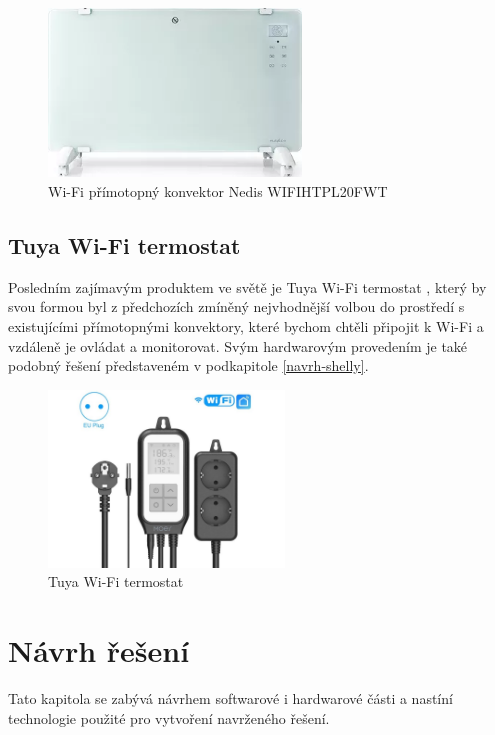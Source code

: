 \begin{figure}[hbt]
\centering
\includegraphics[width=0.6\textwidth]{obrazky-figures/nedis.png}
\caption{Wi-Fi přímotopný konvektor Nedis WIFIHTPL20FWT}
\end{figure}


\section{Tuya Wi-Fi termostat}
Posledním zajímavým produktem ve světě je Tuya Wi-Fi termostat \cite{tuyaterm}, který by svou formou byl z předchozích zmíněný nejvhodnější volbou do prostředí s existujícími přímotopnými konvektory, které bychom chtěli připojit k Wi-Fi a vzdáleně je ovládat a monitorovat. Svým hardwarovým provedením je také podobný řešení představeném v podkapitole \ref{navrh-shelly}.

\begin{figure}[hbt]
\centering
\includegraphics[width=0.56\textwidth]{obrazky-figures/tuyaterm.png}
\caption{Tuya Wi-Fi termostat}
\end{figure}


\chapter{Návrh řešení}
\label{navrh}
Tato kapitola se zabývá návrhem softwarové i hardwarové části a nastíní technologie použité pro vytvoření navrženého řešení.


